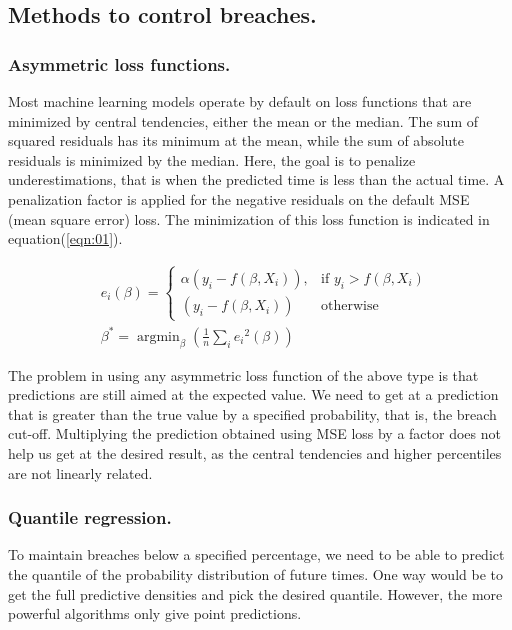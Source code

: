 \documentclass[twoside,leqno,twocolumn]{article}
\DeclareMathOperator*{\argmin}{argmin}
\begin{document}
\subsection{Methods to control breaches.}

\subsubsection{Asymmetric loss functions.}
Most machine learning models operate by default on loss functions that are minimized by central tendencies, either the mean or the median. The sum of squared residuals has its minimum at the mean, while the sum of absolute residuals is minimized by the median. Here, the goal is to penalize underestimations, that is when the predicted time is less than the actual time. A penalization factor is applied for the negative residuals on the default MSE (mean square error) loss\cite{christoffersen1996further}. The minimization of this loss function is indicated in equation(\ref{eqn:01}).

\begin{align}\label{eqn:01}
&e_i(\beta) = \begin{cases}
  \alpha (y_i - f(\beta, X_i)), & \text{if } y_i > f(\beta, X_i) \nonumber \\
  (y_i - f(\beta, X_i)) & \text{otherwise}
 \end{cases}\\
&\beta^{*} = \argmin_{\beta} \left( \frac{1}{n}\sum_i {e_i}^2(\beta) \right)
\end{align}

The problem in using any asymmetric loss function of the above type is that predictions are still aimed at the expected value. We need to get at a prediction that is greater than the true value by a specified probability, that is, the breach cut-off. Multiplying the prediction obtained using MSE loss by a factor does not help us get at the desired result, as the central tendencies and higher percentiles are not linearly related.

\subsubsection{Quantile regression.}
To maintain breaches below a specified percentage, we need to be able to predict the quantile of the probability distribution of future times. One way would be to get the full predictive densities and pick the desired quantile. However, the more powerful algorithms only give point predictions.
\end{document}
